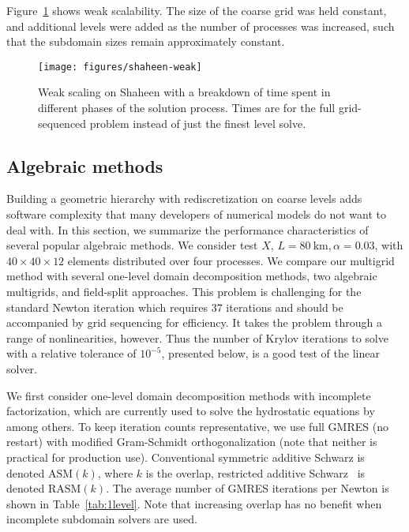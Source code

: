 \documentclass[3p]{elsarticle}
\newcommand{\ASM}{\mathrm{ASM}}
\newcommand{\RASM}{\mathrm{RASM}}
\begin{document}
Figure~\ref{fig:shaheen-weak} shows weak scalability.
The size of the coarse grid was held constant, and additional levels were added as the number of processes was increased, such that the subdomain sizes remain approximately constant.

\begin{figure}
  \texttt{[image: figures/shaheen-weak]}
  \centering\caption{Weak scaling on Shaheen with a breakdown of time spent in different phases of the solution process.
    Times are for the full grid-sequenced problem instead of just the finest level solve.}\label{fig:shaheen-weak}
\end{figure}

\subsection{Algebraic methods}\label{sec:1level}
Building a geometric hierarchy with rediscretization on coarse levels adds software complexity that many developers of numerical models do not want to deal with.  In this section, we summarize the performance characteristics of several popular algebraic methods.  We consider test $X$, $L = \SI{80}{\kilo\metre}, \alpha=0.03$, with $40\times 40\times 12$ elements distributed over four processes. We compare our multigrid method with several one-level domain decomposition methods, two algebraic multigrids, and field-split approaches. This problem is challenging for the standard Newton iteration which requires 37 iterations and should be accompanied by grid sequencing for efficiency. It takes the problem through a range of nonlinearities, however. Thus the number of Krylov iterations to solve with a relative tolerance of $10^{-5}$, presented below, is a good test of the linear solver.

We first consider one-level domain decomposition methods with incomplete factorization, which are currently used to solve the hydrostatic equations by \cite{seacism,issm} among others.  To keep iteration counts representative, we use full GMRES (no restart) with modified Gram-Schmidt orthogonalization (note that neither is practical for production use).  Conventional symmetric additive Schwarz is denoted $\ASM(k)$, where $k$ is the overlap, restricted additive Schwarz~\cite{cai1999restricted} is denoted $\RASM(k)$.  The average number of GMRES iterations per Newton is shown in Table~\ref{tab:1level}.  Note that increasing overlap has no benefit when incomplete subdomain solvers are used.
\end{document}

